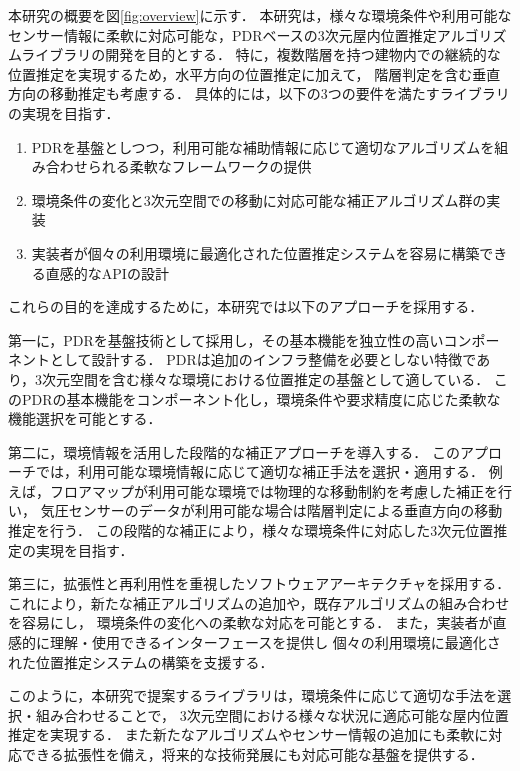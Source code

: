 本研究の概要を図\ref{fig:overview}に示す．
本研究は，様々な環境条件や利用可能なセンサー情報に柔軟に対応可能な，PDRベースの3次元屋内位置推定アルゴリズムライブラリの開発を目的とする．
特に，複数階層を持つ建物内での継続的な位置推定を実現するため，水平方向の位置推定に加えて，
階層判定を含む垂直方向の移動推定も考慮する．
具体的には，以下の3つの要件を満たすライブラリの実現を目指す．

\begin{enumerate}
    \item PDRを基盤としつつ，利用可能な補助情報に応じて適切なアルゴリズムを組み合わせられる柔軟なフレームワークの提供
    \item 環境条件の変化と3次元空間での移動に対応可能な補正アルゴリズム群の実装
    \item 実装者が個々の利用環境に最適化された位置推定システムを容易に構築できる直感的なAPIの設計
\end{enumerate}

これらの目的を達成するために，本研究では以下のアプローチを採用する．

第一に，PDRを基盤技術として採用し，その基本機能を独立性の高いコンポーネントとして設計する．
PDRは追加のインフラ整備を必要としない特徴であり，3次元空間を含む様々な環境における位置推定の基盤として適している．
このPDRの基本機能をコンポーネント化し，環境条件や要求精度に応じた柔軟な機能選択を可能とする．

第二に，環境情報を活用した段階的な補正アプローチを導入する．
このアプローチでは，利用可能な環境情報に応じて適切な補正手法を選択・適用する．
例えば，フロアマップが利用可能な環境では物理的な移動制約を考慮した補正を行い，
気圧センサーのデータが利用可能な場合は階層判定による垂直方向の移動推定を行う．
この段階的な補正により，様々な環境条件に対応した3次元位置推定の実現を目指す．

第三に，拡張性と再利用性を重視したソフトウェアアーキテクチャを採用する．
これにより，新たな補正アルゴリズムの追加や，既存アルゴリズムの組み合わせを容易にし，
環境条件の変化への柔軟な対応を可能とする．
また，実装者が直感的に理解・使用できるインターフェースを提供し
個々の利用環境に最適化された位置推定システムの構築を支援する．

このように，本研究で提案するライブラリは，環境条件に応じて適切な手法を選択・組み合わせることで，
3次元空間における様々な状況に適応可能な屋内位置推定を実現する．
また新たなアルゴリズムやセンサー情報の追加にも柔軟に対応できる拡張性を備え，将来的な技術発展にも対応可能な基盤を提供する．


